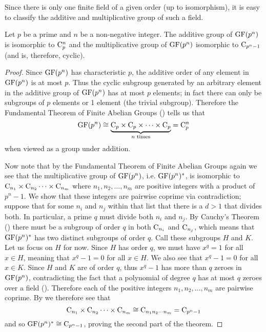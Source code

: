 Since there is only one finite field of a given order (up to isomorphism), it is easy to classify the additive and multiplicative group of such a field.

\begin{theorem}\label{thrm-structure-of-finite-field}
    Let $p$ be a prime and $n$ be a non-negative integer. The additive group of $\mathrm{GF}(p^n)$ is isomorphic to $\mathrm{C}_{p}^n$ and the multiplicative group of $\mathrm{GF}(p^n)$ isomorphic to $\mathrm{C}_{p^n-1}$ (and is, therefore, cyclic).
\end{theorem}
\begin{proof}
    Since $\mathrm{GF}(p^n)$ has characteristic $p$, the additive order of any element in $\mathrm{GF}(p^n)$ is at most $p$. Thus the cyclic subgroup generated by an arbitrary element in the additive group of $\mathrm{GF}(p^n)$ has at most $p$ elements; in fact there can only be subgroups of $p$ elements or 1 element (the trivial subgroup). Therefore the Fundamental Theorem of Finite Abelian Groups () tells us that
    \[
        \mathrm{GF}(p^n) \cong \underbrace{\mathrm{C}_{p} \times \mathrm{C}_{p} \times \cdots \times \mathrm{C}_{p}}_{n\text{ times}} = \mathrm{C}_{p}^n
    \]
    when viewed as a group under addition.

    Now note that by the Fundamental Theorem of Finite Abelian Groups again we see that the multiplicative group of $\mathrm{GF}(p^n)$, i.e. $\mathrm{GF}(p^n)^\ast$, is isomorphic to $\mathrm{C}_{n_1}\times\mathrm{C}_{n_2}\cdots\times\mathrm{C}_{n_m}$ where $n_1, n_2, \dots, n_m$ are positive integers with a product of $p^n - 1$. We show that these integers are pairwise coprime via contradiction; suppose that for some $n_i$ and $n_j$ within that list that there is a $d > 1$ that divides both. In particular, a prime $q$ must divide both $n_i$ and $n_j$. By Cauchy's Theorem () there must be a subgroup of order $q$ in both $\mathrm{C}_{n_i}$ and $\mathrm{C}_{n_j}$, which means that $\mathrm{GF}(p^n)^\ast$ has two distinct subgroups of order $q$. Call these subgroups $H$ and $K$. Let us focus on $H$ for now. Since $H$ has order $q$, we must have $x^q = 1$ for all $x \in H$, meaning that $x^q - 1 = 0$ for all $x \in H$. We also see that $x^q - 1 = 0$ for all $x \in K$. Since $H$ and $K$ are of order $q$, thus $x^q - 1$ has more than $q$ zeroes in $\mathrm{GF}(p^n)$, contradicting the fact that a polynomial of degree $q$ has at most $q$ zeroes over a field (). Therefore each of the positive integers $n_1, n_2, \dots, n_m$ are pairwise coprime. By  we therefore see that
    \[
        \mathrm{C}_{n_1}\times\mathrm{C}_{n_2}\cdots\times\mathrm{C}_{n_m} \cong \mathrm{C}_{n_1n_2\cdots n_m} = \mathrm{C}_{p^n-1}
    \]
    and so $\mathrm{GF}(p^n)^\ast \cong \mathrm{C}_{p^n-1}$, proving the second part of the theorem.
\end{proof}


